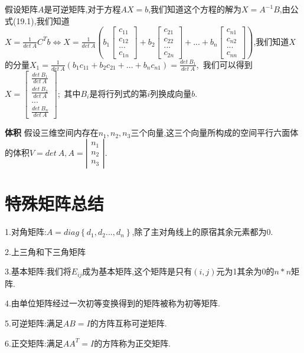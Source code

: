 \documentclass[oneside]{book}
\begin{document}
	假设矩阵$A$是可逆矩阵,对于方程$AX=b$,我们知道这个方程的解为$X=A^{-1}B$,由公式(19.1),我们知道$X=\frac{1}{det\ A}C^{T}b\Leftrightarrow X=\frac{1}{det\ A}(b_{1}\left[\begin{array}{c}
		c_{11}\\c_{12}\\...\\c_{1n}
	\end{array}\right]+b_{2}\left[\begin{array}{c}
	c_{21}\\c_{22}\\...\\c_{2n}
\end{array}\right]+...+b_{n}\left[\begin{array}{c}
c_{n1}\\c_{n2}\\...\\c_{nn}
\end{array}\right])$,我们知道$X$的分量$X_{1}=\frac{1}{det\ A}(b_{1}c_{11}+b_{2}c_{21}+...+b_{n}c_{n1})=\frac{det\ B_{1}}{det\ A}$,\ 我们可以得到$X=\left[\begin{array}{c}
\frac{det\ B_{1}}{det\ A}\\\frac{det\ B_{2}}{det\ A}\\...\\\frac{det\ B_{n}}{det\ A}
\end{array}\right]$;\ 
其中$B_{i}$是将行列式的第$i$列换成向量$b$.

	\textbf{体积}
	假设三维空间内存在$n_{1},n_{2},n_{3}$三个向量,这三个向量所构成的空间平行六面体的体积$V=det\ A,A=\left|\begin{array}{c}
		n_{1}\\n_{2}\\n_{3}
	\end{array}\right|$.
	\chapter{特殊矩阵总结}
	1.对角矩阵:$A=diag\left\lbrace d_{1},d_{2}...,d_{n}\right\rbrace $,除了主对角线上的原宿其余元素都为0.
	
	2.上三角和下三角矩阵
	
	3.基本矩阵:我们将$E_{ij}$成为基本矩阵,这个矩阵是只有$(i,j)$元为1其余为0的$n*n$矩阵.
	
	4.由单位矩阵经过一次初等变换得到的矩阵被称为初等矩阵.
	
	5.可逆矩阵:满足$AB=I$的方阵互称可逆矩阵.
	
	6.正交矩阵:满足$AA^{T}=I$的方阵称为正交矩阵.
	
\end{document}
